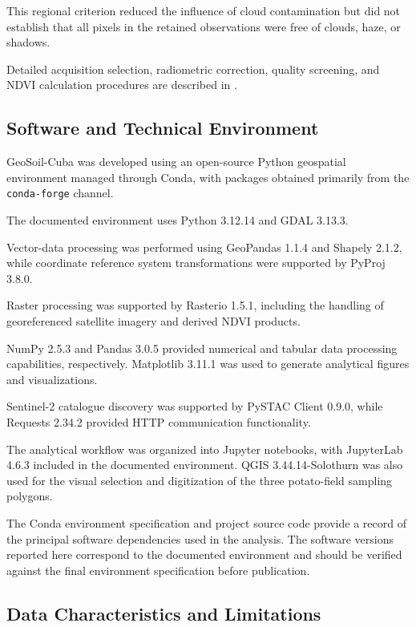 This regional criterion reduced the influence
of cloud contamination but did not establish
that all pixels in the retained observations
were free of clouds, haze, or shadows.

Detailed acquisition selection, radiometric
correction, quality screening, and NDVI
calculation procedures are described in
.


\subsection{Software and Technical Environment}
\label{subsec:software}

GeoSoil-Cuba was developed using an open-source
Python geospatial environment managed through
Conda, with packages obtained primarily from
the \texttt{conda-forge} channel.

The documented environment uses Python 3.12.14
and GDAL 3.13.3.

Vector-data processing was performed using
GeoPandas 1.1.4 and Shapely 2.1.2, while
coordinate reference system transformations
were supported by PyProj 3.8.0.

Raster processing was supported by Rasterio
1.5.1, including the handling of georeferenced
satellite imagery and derived NDVI products.

NumPy 2.5.3 and Pandas 3.0.5 provided numerical
and tabular data processing capabilities,
respectively. Matplotlib 3.11.1 was used to
generate analytical figures and visualizations.

Sentinel-2 catalogue discovery was supported
by PySTAC Client 0.9.0, while Requests 2.34.2
provided HTTP communication functionality.

The analytical workflow was organized into
Jupyter notebooks, with JupyterLab 4.6.3
included in the documented environment.
QGIS 3.44.14-Solothurn was also used for the visual selection
and digitization of the three potato-field
sampling polygons.

The Conda environment specification and project
source code provide a record of the principal
software dependencies used in the analysis.
The software versions reported here correspond
to the documented environment and should be
verified against the final environment
specification before publication.


\subsection{Data Characteristics and Limitations}
\label{subsec:data-limitations}

